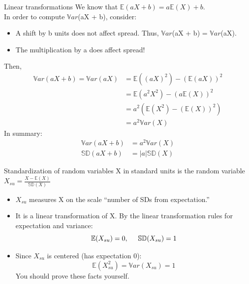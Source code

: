 \documentclass[aspectratio=169]{../latex_main/tntbeamer}  %
\begin{document}
	
	\begin{frame}[c]{Linear transformations}
	   We know that       $\mathbb{E}(aX + b) = a\mathbb{E}(X) + b$. \\                  In order to compute $\mathbb{V}ar$(aX + b), consider:
	    \begin{itemize}
	        \item A shift by b units does not affect spread. Thus, $\mathbb{V}ar$(aX + b) = $\mathbb{V}ar$(aX).
	        \item The multiplication by a does affect spread!
	    \end{itemize}
	    Then,
	    \begin{align*}
	        \mathbb{V}ar(aX + b) = \mathbb{V}ar(aX) &= \mathbb{E}((aX)^2) - (\mathbb{E}(aX))^2\\
	        &= \mathbb{E}(a^2X^2) - (a\mathbb{E}(X))^2\\
	        &= a^2(\mathbb{E}(X^2) - (\mathbb{E}(X))^2)\\
	        &= a^2\mathbb{V}ar(X)
	    \end{align*}
	    In summary:
	    \begin{align*}
	        \mathbb{V}ar(aX + b) &= a^2\mathbb{V}ar(X)\\
	        \mathbb{SD}(aX + b) &= |a|\mathbb{SD}(X)
	    \end{align*}
	\end{frame}
	
	
	\begin{frame}[c]{Standardization of random variables}
	   X in standard units is the random variable $X_{su} = \frac{X- \mathbb{E}(X)}{\mathbb{SD}(X)}$
	   \begin{itemize}
	       \item $X_{su}$ measures X on the scale “number of SDs from expectation.”
	       \item It is a linear transformation of X. By the linear transformation rules for expectation and variance:
	       \begin{equation*}
	           \mathbb{E}(X_{su})  = 0, \hspace{5mm} \mathbb{SD}(X_{su}) = 1
	       \end{equation*}
	       \item Since $X_{su}$ is centered (has expectation 0):
	       \begin{equation*}
	           \mathbb{E}(X^2_{su}) = \mathbb{V}ar(X_{su}) = 1
	       \end{equation*}
	       You should prove these facts yourself.
	   \end{itemize}
	\end{frame}
	
\end{document}
